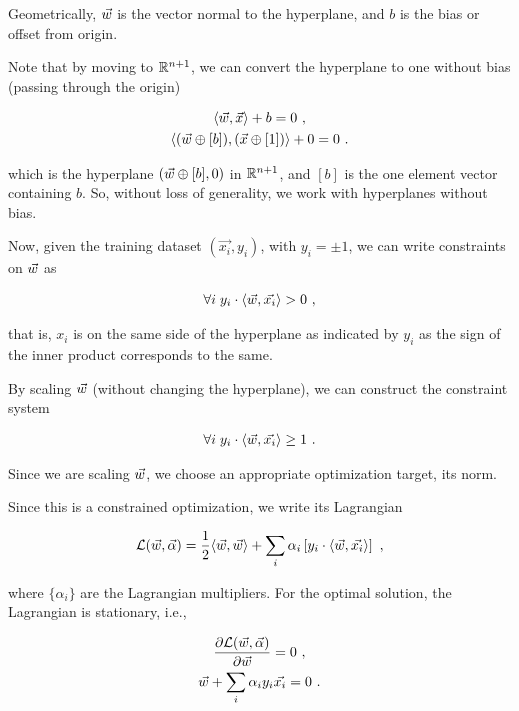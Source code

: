 Geometrically, \(\vec{w}\) is the vector normal to the hyperplane, and \(b\)
is the bias or offset from origin.

Note that by moving to \(\mathbb{R}^{n+1}\), we can convert the hyperplane to one
without bias (passing through the origin)

\begin{gather*}
    \langle \vec{w}, \vec{x}\rangle + b = 0~,\\
    \langle (\vec{w} \oplus [b]), (\vec{x} \oplus [1])\rangle + 0 = 0~.
\end{gather*}

which is the hyperplane \((\vec{w} \oplus [b], 0)\) in \(\mathbb{R}^{n+1}\), and
\([b]\) is the one element vector containing \(b\). So, without loss of
generality, we work with hyperplanes without bias.

Now, given the training dataset \({(\vec{x_i}, y_i)}\), with \(y_i = \pm 1\), we
can write constraints on \(\vec{w}\) as

\begin{gather}
    \forall i\; y_i \cdot \langle \vec{w}, \vec{x_i}\rangle > 0~,
\end{gather}

that is, \(x_i\) is on the same side of the hyperplane as indicated by \(y_i\)
as the sign of the inner product corresponds to the same. 

By scaling \(\vec{w}\) (without changing the hyperplane), we can construct the
constraint system

\begin{gather}
    \forall i\; y_i \cdot \langle \vec{w}, \vec{x_i}\rangle \geq 1~.
\end{gather}

Since we are scaling \(\vec{w}\), we choose an appropriate optimization target,
its norm.

Since this is a constrained optimization, we write its Lagrangian

\begin{gather}
    \mathcal{L}(\vec{w}, \vec{\alpha}) = \frac{1}{2} \langle \vec{w}, \vec{w}\rangle + \sum_i \alpha_i \left[y_i \cdot \langle \vec{w}, \vec{x_i}\rangle\right]~,
\end{gather}

where \(\{\alpha_i\}\) are the Lagrangian multipliers. For the optimal solution,
the Lagrangian is stationary, i.e.,

\begin{gather}
    \frac{\partial \mathcal{L}(\vec{w}, \vec{\alpha})}{\partial \vec{w}} = 0~,\nonumber\\
    \vec{w} + \sum_i \alpha_i y_i \vec{x_i} = 0~.
\end{gather}

